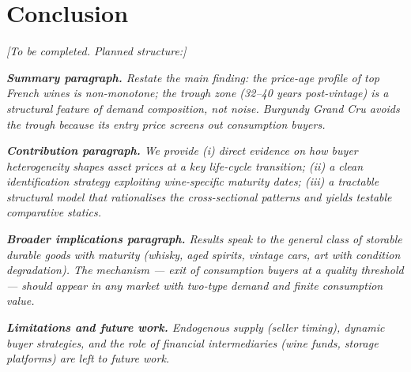 
\section{Conclusion}
\label{sec:conclusion}

\noindent\textit{[To be completed. Planned structure:]}

\noindent\textit{\textbf{Summary paragraph.} Restate the main finding: the price-age profile of
top French wines is non-monotone; the trough zone (32--40 years post-vintage) is a structural
feature of demand composition, not noise. Burgundy Grand Cru avoids the trough because its
entry price screens out consumption buyers.}

\noindent\textit{\textbf{Contribution paragraph.} We provide (i) direct evidence on how buyer
heterogeneity shapes asset prices at a key life-cycle transition; (ii) a clean identification
strategy exploiting wine-specific maturity dates; (iii) a tractable structural model that
rationalises the cross-sectional patterns and yields testable comparative statics.}

\noindent\textit{\textbf{Broader implications paragraph.} Results speak to the general class
of storable durable goods with maturity (whisky, aged spirits, vintage cars, art with condition
degradation). The mechanism — exit of consumption buyers at a quality threshold — should appear
in any market with two-type demand and finite consumption value.}

\noindent\textit{\textbf{Limitations and future work.} Endogenous supply (seller timing),
dynamic buyer strategies, and the role of financial intermediaries (wine funds, storage
platforms) are left to future work.}
